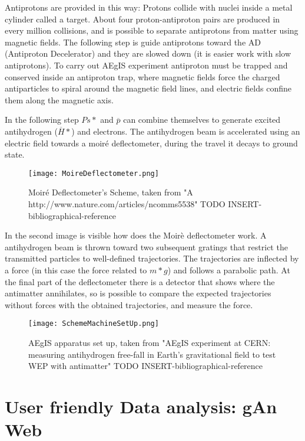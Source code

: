 Antiprotons are provided in this way:
Protons collide with nuclei inside a metal cylinder called a target. About four proton-antiproton pairs are produced in every million collisions, and is possible to separate antiprotons from matter using magnetic fields. The following step is guide antiprotons toward the AD (Antiproton Decelerator) and they are slowed down (it is easier work with slow antiprotons). To carry out AEgIS experiment antiproton must be trapped and conserved inside an antiproton trap, where magnetic fields force the charged antiparticles to spiral around the magnetic field lines, and electric fields confine them along the magnetic axis.

In the following step $ {Ps*} $ and $ \overline{p} $ can combine themselves to generate excited antihydrogen ($ \overline{H}* $) and electrons. The antihydrogen beam is accelerated using an electric field towards a moiré deflectometer, during the travel it decays to ground state.  


\begin{figure}[H]
\centering
\texttt{[image: MoireDeflectometer.png]} 
\caption{Moiré Deflectometer's Scheme, taken from "A
http://www.nature.com/articles/ncomms5538" TODO INSERT-bibliographical-reference}
\end{figure}

In the second image is visible how does the Moirè deflectometer work.
A antihydrogen beam is thrown toward two subsequent gratings that restrict the transmitted particles to well-defined trajectories. The trajectories are inflected by a force (in this case the force related to $ {m*g} $) and follows a parabolic path. At the final part of the deflectometer there is a detector that shows where the antimatter annihilates, so is possible to compare the expected trajectories without forces with the obtained trajectories, and measure the force.


\begin{figure}[H]
\centering
\texttt{[image: SchemeMachineSetUp.png]} 
\caption{AEgIS apparatus set up, taken from "AEgIS experiment at CERN: measuring antihydrogen free-fall in Earth’s gravitational field to test WEP with antimatter" TODO INSERT-bibliographical-reference}
\end{figure}

\section{User friendly Data analysis: gAn Web}

